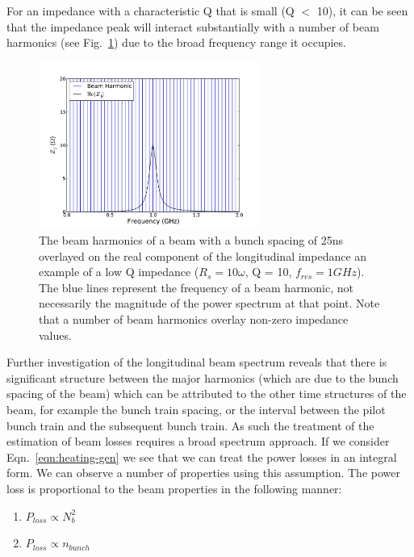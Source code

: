 For an impedance with a characteristic Q that is small (Q $<$ 10), it can be seen that the impedance peak will interact substantially with a number of beam harmonics (see Fig.~\ref{fig:low_q_harmonics}) due to the broad frequency range it occupies.

\begin{figure}
\begin{center}
\includegraphics[width=0.65\textwidth]{Wakefields_and_Impedances/figures/low_q_10_resonance_beam_harmonics.pdf}
\end{center}
\caption{The beam harmonics of a beam with a bunch spacing of 25ns overlayed on the real component of the longitudinal impedance an example of a low Q impedance ($R_{s}=10\omega$, Q = 10, $f_{res}=1GHz$). The blue lines represent the frequency of a beam harmonic, not necessarily the magnitude of the power spectrum at that point. Note that a number of beam harmonics overlay non-zero impedance values.}
\label{fig:low_q_harmonics}
\end{figure}

Further investigation of the longitudinal beam spectrum reveals that there is significant structure between the major harmonics (which are due to the bunch spacing of the beam) which can be attributed to the other time structures of the beam, for example the bunch train spacing, or the interval between the pilot bunch train and the subsequent bunch train. As such the treatment of the estimation of beam losses requires a broad spectrum approach. If we consider Eqn.~\ref{eqn:heating-gen} we see that we can treat the power losses in an integral form. We can observe a number of properties using this assumption. The power loss is proportional to the beam properties in the following manner:

\begin{enumerate}
\item{$P_{loss} \propto N_{b}^{2}$}
\item{$P_{loss} \propto n_{bunch}$}
\end{enumerate}

